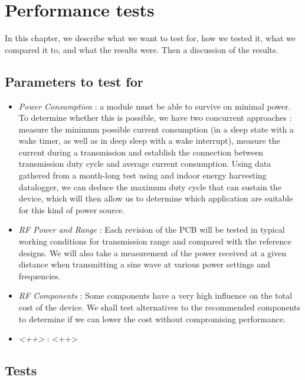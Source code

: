 \chapter{Performance tests}\label{ch:performance} %

In this chapter, we describe what we want to test for, how we tested it, what we
compared it to, and what the results were. Then a discussion of the results.

\section{Parameters to test for}

\begin{itemize}
  \item \emph{Power Consumption} : a module must be able to survive on minimal
    power. To determine whether this is possible, we have two concurrent
    approaches : measure the minimum possible current consumption (in a sleep
    state with a wake timer, as well as in deep sleep with a wake interrupt),
    measure the current during a transmission and establish the connection
    between transmission duty cycle and average current consumption. Using data
    gathered from a month-long test using and indoor energy harvesting
    datalogger, we can deduce the maximum duty cycle that can sustain the
    device, which will then allow us to determine which application are suitable
    for this kind of power source.
  \item \emph{RF Power and Range} : Each revision of the PCB will be tested in
    typical working conditions for transmission range and compared with the
    reference designs. We will also take a measurement of the power received at
    a given distance when transmitting a sine wave at various power settings and
    frequencies.
  \item \emph{RF Components} : Some components have a very high influence on the
    total cost of the device. We shall test alternatives to the recommended
    components to determine if we can lower the cost without compromising
    performance.
  \item \emph{<++>} : <++>
\end{itemize}

\section{Tests}

